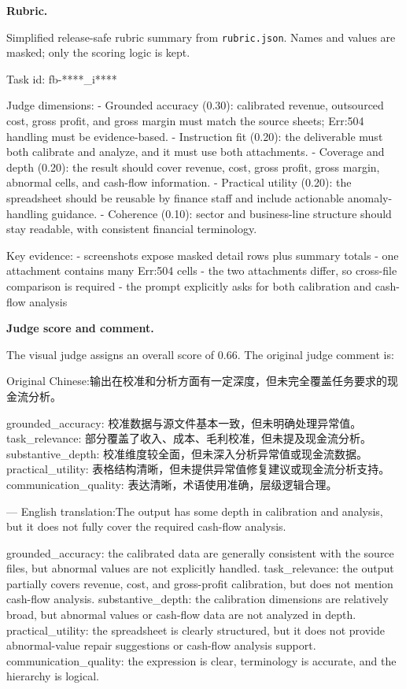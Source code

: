 \documentclass{llmxive}
\providecommand{\inlinett}[1]{{\footnotesize\texttt{#1}}}
\providecommand{\caseheader}[1]{\noindent\colorbox{fbcaseblue}{\parbox{0.96\linewidth}{\bfseries #1}}\vspace{0.5mm}\newline}
\begin{document}
\caseheader{Rubric.}
Simplified release-safe rubric summary from \inlinett{rubric.json}. Names and values are masked; only the scoring logic is kept.
\begin{casebox}\scriptsize
\begin{caselines}
Task id: fb-****\_i****

Judge dimensions:
- Grounded accuracy (0.30): calibrated revenue, outsourced cost, gross profit, and gross margin must match the source sheets; Err:504 handling must be evidence-based.
- Instruction fit (0.20): the deliverable must both calibrate and analyze, and it must use both attachments.
- Coverage and depth (0.20): the result should cover revenue, cost, gross profit, gross margin, abnormal cells, and cash-flow information.
- Practical utility (0.20): the spreadsheet should be reusable by finance staff and include actionable anomaly-handling guidance.
- Coherence (0.10): sector and business-line structure should stay readable, with consistent financial terminology.

Key evidence:
- screenshots expose masked detail rows plus summary totals
- one attachment contains many Err:504 cells
- the two attachments differ, so cross-file comparison is required
- the prompt explicitly asks for both calibration and cash-flow analysis
\end{caselines}
\end{casebox}


\caseheader{Judge score and comment.}
The visual judge assigns an overall score of 0.66. The original judge comment is:

\begin{casebox}\scriptsize
\begin{caselines}
Original Chinese:\nopagebreak[4]
输出在校准和分析方面有一定深度，但未完全覆盖任务要求的现金流分析。

grounded\_accuracy: 校准数据与源文件基本一致，但未明确处理异常值。
task\_relevance: 部分覆盖了收入、成本、毛利校准，但未提及现金流分析。
substantive\_depth: 校准维度较全面，但未深入分析异常值或现金流数据。
practical\_utility: 表格结构清晰，但未提供异常值修复建议或现金流分析支持。
communication\_quality: 表达清晰，术语使用准确，层级逻辑合理。

---
English translation:\nopagebreak[4]
The output has some depth in calibration and analysis, but it does not fully cover the required cash-flow analysis.

grounded\_accuracy: the calibrated data are generally consistent with the source files, but abnormal values are not explicitly handled.
task\_relevance: the output partially covers revenue, cost, and gross-profit calibration, but does not mention cash-flow analysis.
substantive\_depth: the calibration dimensions are relatively broad, but abnormal values or cash-flow data are not analyzed in depth.
practical\_utility: the spreadsheet is clearly structured, but it does not provide abnormal-value repair suggestions or cash-flow analysis support.
communication\_quality: the expression is clear, terminology is accurate, and the hierarchy is logical.
\end{caselines}
\end{casebox}
\end{document}
